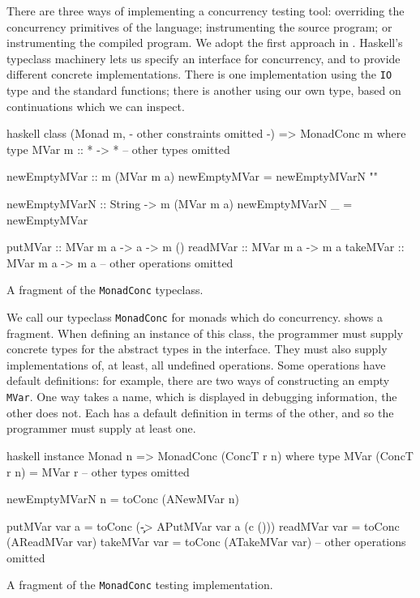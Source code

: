 There are three ways of implementing a concurrency testing tool:
overriding the concurrency primitives of the language; instrumenting
the source program; or instrumenting the compiled program.  We adopt
the first approach in \dejafu{}.  Haskell's typeclass machinery lets
us specify an interface for concurrency, and to provide different
concrete implementations.  There is one implementation using the
\verb|IO| type and the standard functions; there is another using our
own type, based on continuations which we can inspect.

\begin{listing}
\centering
\begin{cminted}{haskell}
class (Monad m, {- other constraints omitted -}) => MonadConc m where
  type MVar m :: * -> *
  -- other types omitted

  newEmptyMVar :: m (MVar m a)
  newEmptyMVar = newEmptyMVarN ""

  newEmptyMVarN :: String -> m (MVar m a)
  newEmptyMVarN _ = newEmptyMVar

  putMVar  :: MVar m a -> a -> m ()
  readMVar :: MVar m a -> m a
  takeMVar :: MVar m a -> m a
  -- other operations omitted
\end{cminted}
\caption{A fragment of the \texttt{MonadConc} typeclass.}\label{lst:monadconc}
\end{listing}

We call our typeclass \verb|MonadConc| for monads which do
concurrency.   shows a fragment.  When defining an
instance of this class, the programmer must supply concrete types for
the abstract types in the interface.  They must also supply
implementations of, at least, all undefined operations.  Some
operations have default definitions: for example, there are two ways
of constructing an empty \verb|MVar|.  One way takes a name, which is
displayed in debugging information, the other does not.  Each has a
default definition in terms of the other, and so the programmer must
supply at least one.

\begin{listing}
\centering
\begin{cminted}{haskell}
instance Monad n => MonadConc (ConcT r n) where
  type MVar (ConcT r n) = MVar r
  -- other types omitted

  newEmptyMVarN n = toConc (ANewMVar n)

  putMVar  var a = toConc (\c -> APutMVar var a (c ()))
  readMVar var   = toConc (AReadMVar var)
  takeMVar var   = toConc (ATakeMVar var)
  -- other operations omitted
\end{cminted}
\caption{A fragment of the \texttt{MonadConc} testing implementation.}\label{lst:mvarops}
\end{listing}

